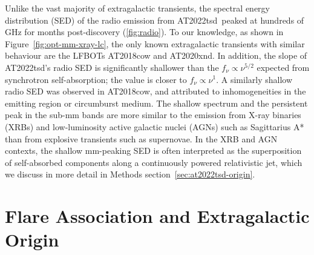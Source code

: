 \documentclass{nature_plusfigure}
\newcommand{\at}{AT2022tsd}
\begin{document}
\begin{methods}
Unlike the vast majority of extragalactic transients, the spectral energy distribution (SED) of the radio emission from \at\ peaked at hundreds of GHz for months post-discovery (\ref{fig:radio}). To our knowledge, as shown in Figure~\ref{fig:opt-mm-xray-lc}, the only known extragalactic transients with similar behaviour are the LFBOTs AT2018cow\cite{Ho2019} and AT2020xnd\cite{Ho2022_AT2020xnd,Bright2022}.
In addition, the slope of \at's radio SED is significantly shallower than the $f_\nu \propto \nu^{5/2}$ expected from synchrotron self-absorption\cite{Rybicki1986}; the value is closer to $f_\nu \propto \nu^{1}$. A similarly shallow radio SED was observed in AT2018cow\cite{Nayana2021}, and attributed to inhomogeneities in the emitting region or circumburst medium\cite{Nayana2021}.
The shallow spectrum and the persistent peak in the sub-mm bands are more similar to the emission from X-ray binaries (XRBs\cite{Fender2001,Tetarenko2021,Fender2023}) and low-luminosity active galactic nuclei (AGNs) such as Sagittarius A*\cite{Falcke1998} than from explosive transients such as supernovae\cite{Chevalier1998}. 
In the XRB and AGN contexts, the shallow mm-peaking SED is often interpreted as the superposition of self-absorbed components along a continuously powered relativistic jet\cite{Blandford1979}, which we discuss in more detail in Methods section~\ref{sec:at2022tsd-origin}.

\section{Flare Association and Extragalactic Origin}
\label{sec:flare-association}


\end{methods}
\end{document}
